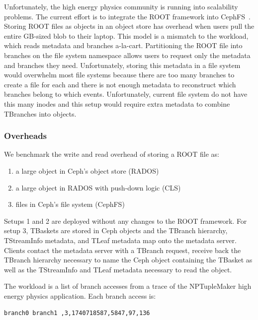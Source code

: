Unfortunately, the high energy physics community is running into scalability
problems.  The current effort is to integrate the ROOT framework into
CephFS~\cite{weil:osdi2006-ceph}.  Storing ROOT files as objects in an object
store has overhead when users pull the entire GB-sized blob to their laptop.
This model is a mismatch to the workload, which reads metadata and branches
a-la-cart. Partitioning the ROOT file into branches on the file system
namespace allows users to request only the metadata and branches they need.
Unfortunately, storing this metadata in a file system would overwhelm most file
systems because there are too many branches to create a file for each and there
is not enough metadata to reconstruct which branches belong to which events.
Unfortunately, current file system do not have this many inodes and this setup
would require extra metadata to combine TBranches into objects.

\subsubsection{Overheads}

We benchmark the write and read overhead of storing a ROOT file as:

\begin{enumerate}
  \item a large object in Ceph's object store (RADOS)
  \item a large object in RADOS with push-down logic (CLS)
  \item files in Ceph's file system (CephFS)
\end{enumerate}

Setups 1 and 2 are deployed without any changes to the ROOT framework. For
setup 3, TBaskets are stored in Ceph objects and the TBranch hierarchy,
TStreamInfo metadata, and TLeaf metadata map onto the metadata server.
Clients contact the metadata server with a TBranch request, receive back
the TBranch hierarchy necessary to name the Ceph object containing the TBasket
as well as the TStreamInfo and TLeaf metadata necessary to read the object. 

The workload is a list of branch accesses from a trace of the NPTupleMaker high
energy physics application. Each branch access is:

\noindent\texttt{branch0 branch1 ,3,1740718587,5847,97,136}

